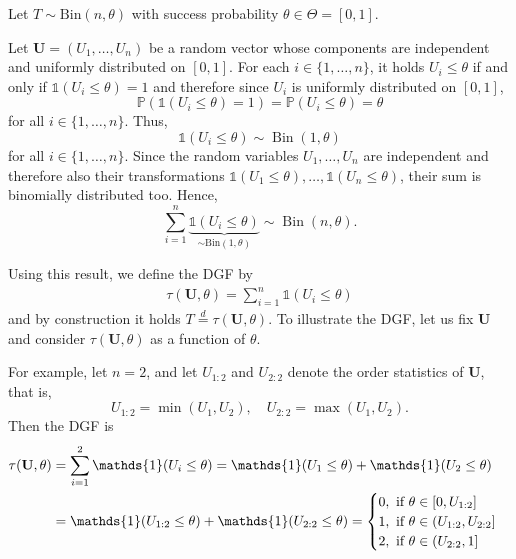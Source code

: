 \begin{example} \label{example: non invertible DGF}
	
	Let \(T \sim \text{Bin}(n,\theta)\) with success probability $\theta \in \Theta = [0, 1]$.
	
	Let \(\mathbf U=(U_1,\ldots,U_n)\) be a random vector whose components are independent and uniformly distributed on \([0,1]\). For each \(i \in \{1, \ldots , n\}\),  it holds
	$U_i \leq \theta$ if and only if
	$\mathds{1}(U_i\leq\theta)=1$
	and therefore since \(U_i\) is uniformly distributed on \([0,1]\),
	\[
	\mathbb P\left(\mathds{1}(U_i \leq \theta)=1\right)
	=
	\mathbb P(U_i \leq \theta)
	=
	\theta
	\]
	for all $i \in \{1, \ldots , n\}$.
	Thus,
	\[
	\mathds{1}(U_i \leq \theta)\sim\operatorname{Bin}(1,\theta)
	\]
	for all \(i\in\{1,\ldots,n\}\). Since the random variables $U_1, \ldots , U_n$ are independent and therefore also their transformations $\mathds{1}(U_1 \leq \theta), \ldots ,  \mathds{1}(U_n \leq \theta)$, their sum is binomially distributed too. Hence,
	\[
	\sum_{i=1}^n \underbrace{\mathds{1}(U_i \leq \theta)}_{\sim \text{Bin}(1, \theta)}
	\sim \operatorname{Bin}(n,\theta).
	\]
	
	Using this result, we define the DGF by
	\begin{align} \label{dgf in clopper pearson case}
		\tau(\mathbf U,\theta)
		=
		\sum_{i=1}^n \mathds{1}(U_i\leq\theta)
	\end{align}
	and by construction it holds
	\(
	T\overset{d}{=}\tau(\mathbf U,\theta)
	\).	
	To illustrate the DGF, let us fix \(\mathbf U\) and consider \(\tau(\mathbf U,\theta)\) as a function of \(\theta\).
	
	For example, let \(n=2\), and let \(U_{1:2}\) and \(U_{2:2}\) denote the order statistics of \(\mathbf U\), that is,
	\[
	U_{1:2}=\min(U_1,U_2)
	, \quad
	U_{2:2}=\max(U_1,U_2).
	\]
	Then the DGF is
	\begin{align}
		\tau (\mathbf U, \theta)
		&=
		\sum_{i = 1}^2 \mathds{1} (U_i \leq \theta)
		=
		\mathds{1} (U_1 \leq \theta) +  \mathds{1} (U_2 \leq \theta)
		\notag \\ 
		&= 
		\mathds{1} (U_{1:2} \leq \theta) +  \mathds{1} (U_{2:2} \leq \theta) 
		=
		\begin{cases}
			0, \text{ if } \theta \in [0, U_{1:2}] \\
			1, \text{ if } \theta \in (U_{1:2}, U_{2:2}] \\
			2, \text{ if } \theta \in (U_{2:2}, 1]
		\end{cases}
		\label{dgf for clopper pearson example}
	\end{align}
	

\end{example}
